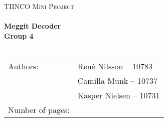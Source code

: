 \documentclass[MiniProjectMain]{subfiles}
\begin{document}
\begin{center}

\textsc{\Large TIINCO Mini Project}\\[0.5cm]


\HRule \\[0.4cm]

{ \huge \bfseries Meggit Decoder}\\[0.4cm]
{ \huge \bfseries Group 4}\\[0.4cm] 

\HRule \\[1.5cm]

\begin{tabular}{p{}|p{}}
\hline 
Authors: & René Nilsson -- 10783\\ & Camilla Munk -- 10737\\ &Kasper Nielsen -- 10731\\ 
\hline 
Number of pages: & \pageref{LastPage} \\
\hline 
\end{tabular} 

\end{center}
\end{document}
